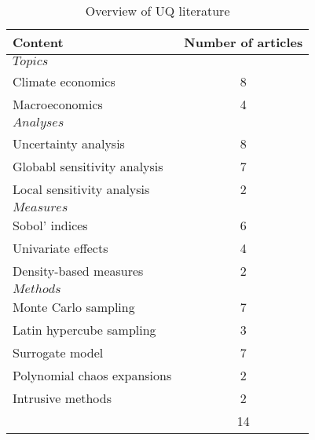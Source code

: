 \documentclass[a4paper,12pt]{article}
\begin{document}
\begin{table}[H]
	\centering
	\caption{Overview of UQ literature}
	\label{tab:lit}
	\renewcommand{\arraystretch}{1.2}%
	\begin{tabular}{lc}
		\toprule
		Content                      & Number of articles \\ \midrule
		$Topics$                       &                    \\
		\qquad Climate economics            & 8                  \\
		\qquad Macroeconomics               & 4                 \\ \midrule
		$Analyses$                     &                    \\
		\qquad Uncertainty analysis      & 8                  \\
		\qquad Globabl sensitivity analysis & 7                  \\
		\qquad Local sensitivity analysis   & 2                  \\ \midrule
		$Measures$                     &                    \\
		\qquad Sobol' indices               & 6                  \\
		\qquad Univariate effects           & 4                  \\
		\qquad Density-based measures & 2                  \\ \midrule
		$Methods$                      &                    \\
		\qquad Monte Carlo sampling         & 7                  \\
		\qquad Latin hypercube sampling         & 3                  \\
		\qquad Surrogate model              & 7                  \\
		\qquad Polynomial chaos expansions  & 2                  \\
		\qquad Intrusive methods            & 2                  \\ \midrule
		& 14                 \\ \bottomrule
	\end{tabular}
\end{table}
\noindent
\end{document}
